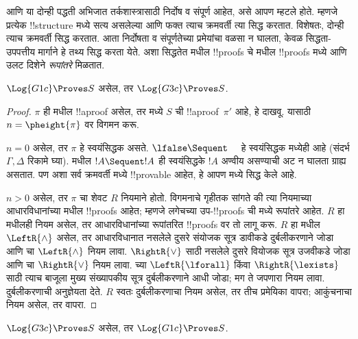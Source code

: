 \documentclass[../../../include/open-logic-section]{subfiles}
\begin{document}


 आणि  या दोन्ही पद्धती अभिजात तर्कशास्त्रासाठी
निर्दोष व संपूर्ण आहेत, असे आपण म्हटले होते. म्हणजे प्रत्येक
!!{structure} मध्ये सत्य असलेल्या आणि फक्त त्याच क्रमवर्ती त्या
सिद्ध करतात. विशेषतः, दोन्ही त्याच क्रमवर्ती सिद्ध करतात. आता
निर्दोषता व संपूर्णतेच्या प्रमेयांचा वळसा न घालता, केवळ
सिद्धता-उपपत्तीय मार्गाने हे तथ्य सिद्ध करता येते. अशा
सिद्धतेत  मधील !!{proof}s चे  मधील
!!{proof}s मध्ये आणि उलट दिशेने \emph{रूपांतरे} मिळतात.

\begin{prop}
$\Log{G1c} \Proves S$ असेल, तर $\Log{G3c} \Proves S$.
\end{prop}

\begin{proof}
  $\pi$ ही  मधील !!a{proof} असेल, तर  मध्ये
  $S$ ची !!a{proof}~$\pi'$ आहे, हे दाखवू. यासाठी $n
  = \pheight{\pi}$ वर विगमन करू.

  $n = 0$ असेल, तर $\pi$ हे स्वयंसिद्धक असते. $\lfalse \Sequent
  \quad$ हे स्वयंसिद्धक  मध्येही आहे (संदर्भ $\Gamma,
  \Delta$ रिकामे घ्या).  मधील $!A \Sequent !A$ ही
  स्वयंसिद्धके $!A$ अण्वीय असण्याची अट न घालता ग्राह्य असतात.
  पण अशा सर्व क्रमवर्ती  मध्ये !!{provable} आहेत, हे आपण
   मध्ये सिद्ध केले आहे.

  $n>0$ असेल, तर $\pi$ चा शेवट $R$ नियमाने होतो. विगमनाचे
  गृहीतक सांगते की त्या नियमाच्या आधारविधानांच्या 
  मधील !!{proof}s आहेत; म्हणजे लगेचच्या उप-!!{proof}s ची
   मध्ये रूपांतरे आहेत. $R$ हा  मधीलही नियम
  असेल, तर आधारविधानांच्या रूपांतरित !!{proof}s वर तो लागू करू.
  $R$ हा  मधील $\LeftR{\land}$ असेल,
  तर आधारविधानात नसलेले दुसरे संयोजक सूत्र डावीकडे
  दुर्बलीकरणाने जोडा आणि  चा $\LeftR{\land}$
  नियम लावा. $\RightR{\lor}$ साठी नसलेले दुसरे वियोजक
  सूत्र उजवीकडे जोडा आणि  चा $\RightR{\lor}$
  नियम लावा.  च्या $\LeftR{\lforall}$ किंवा
  $\RightR{\lexists}$ साठी त्याच बाजूला मुख्य संख्यापकीय
  सूत्र दुर्बलीकरणाने आधी जोडा; मग ते जपणारा 
  नियम लावा. दुर्बलीकरणाची अनुज्ञेयता
   देते. $R$ स्वतः
  दुर्बलीकरणाचा नियम असेल, तर तीच प्रमेयिका वापरा;
  आकुंचनाचा नियम असेल, तर
   वापरा.
\end{proof}

\begin{prop}
$\Log{G3c} \Proves S$ असेल, तर $\Log{G1c} \Proves S$.
\end{prop}
\end{document}
